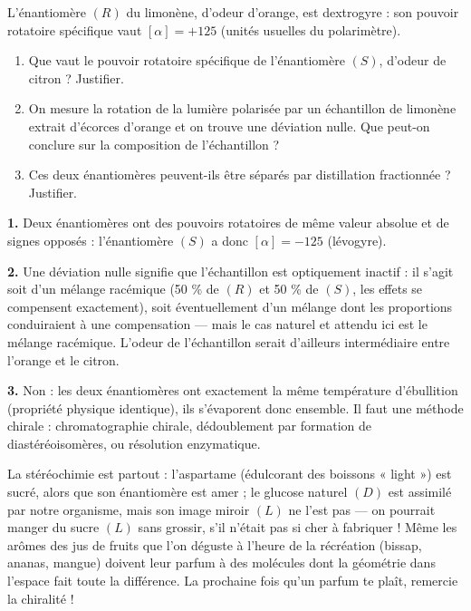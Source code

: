 \documentclass[11pt]{article}
\begin{document}
\begin{exercice}
L'énantiomère $(R)$ du limonène, d'odeur d'orange, est dextrogyre : son pouvoir rotatoire spécifique vaut $[\alpha] = +125$ (unités usuelles du polarimètre).
\begin{enumerate}
\item Que vaut le pouvoir rotatoire spécifique de l'énantiomère $(S)$, d'odeur de citron ? Justifier.
\item On mesure la rotation de la lumière polarisée par un échantillon de limonène extrait d'écorces d'orange et on trouve une déviation nulle. Que peut-on conclure sur la composition de l'échantillon ?
\item Ces deux énantiomères peuvent-ils être séparés par distillation fractionnée ? Justifier.
\end{enumerate}
\end{exercice}

\begin{corrige}
\textbf{1.} Deux énantiomères ont des pouvoirs rotatoires de même valeur absolue et de signes opposés : l'énantiomère $(S)$ a donc $[\alpha] = -125$ (lévogyre).

\textbf{2.} Une déviation nulle signifie que l'échantillon est optiquement inactif : il s'agit soit d'un mélange racémique (50 \% de $(R)$ et 50 \% de $(S)$, les effets se compensent exactement), soit éventuellement d'un mélange dont les proportions conduiraient à une compensation — mais le cas naturel et attendu ici est le mélange racémique. L'odeur de l'échantillon serait d'ailleurs intermédiaire entre l'orange et le citron.

\textbf{3.} Non : les deux énantiomères ont exactement la même température d'ébullition (propriété physique identique), ils s'évaporent donc ensemble. Il faut une méthode chirale : chromatographie chirale, dédoublement par formation de diastéréoisomères, ou résolution enzymatique.
\end{corrige}

\begin{savaistu}[Et au quotidien ?]
La stéréochimie est partout : l'aspartame (édulcorant des boissons « light ») est sucré, alors que son énantiomère est amer ; le glucose naturel $(D)$ est assimilé par notre organisme, mais son image miroir $(L)$ ne l'est pas — on pourrait manger du sucre $(L)$ sans grossir, s'il n'était pas si cher à fabriquer ! Même les arômes des jus de fruits que l'on déguste à l'heure de la récréation (bissap, ananas, mangue) doivent leur parfum à des molécules dont la géométrie dans l'espace fait toute la différence. La prochaine fois qu'un parfum te plaît, remercie la chiralité !
\end{savaistu}
\end{document}
